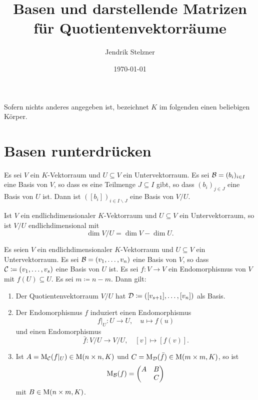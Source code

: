 \documentclass[a4paper,10pt]{article}
\title{Basen und darstellende Matrizen \\ für Quotientenvektorräume}
\author{Jendrik Stelzner}
\date{\today}
\begin{document}
\maketitle





Sofern nichts anderes angegeben ist, bezeichnet $K$ im folgenden einen beliebigen Körper.





\section{Basen runterdrücken}

\begin{lemma}
  Es sei $V$ ein $K$-Vektorraum und $U \subseteq V$ ein Untervektorraum.
  Es sei $\mathcal{B} = (b_i)_{i \in I}$ eine Basis von $V$, so dass es eine Teilmenge $J \subseteq I$ gibt, so dass $(b_i)_{j \in J}$ eine Basis von $U$ ist.
  Dann ist $([b_i])_{i \in I \smallsetminus J}$ eine Basis von $V/U$.
\end{lemma}

\begin{corollary}
  Ist $V$ ein endlichdimensionaler $K$-Vektorraum und $U \subseteq V$ ein Untervektorraum, so ist $V/U$ endlichdimensional mit
  \[
    \dim V/U = \dim V - \dim U.
  \]
\end{corollary}

\begin{proposition}
  Es seien $V$ ein endlichdimensionaler $K$-Vektorraum und $U \subseteq V$ ein Untervektorraum.
  Es sei $\mathcal{B} = (v_1, \dotsc, v_n)$ eine Basis von $V$, so dass $\mathcal{C} \coloneqq (v_1, \dotsc, v_s)$ eine Basis von $U$ ist.
  Es sei $f \colon V \to V$ ein Endomorphismus von $V$ mit $f(U) \subseteq U$.
  Es sei $m \coloneqq n-m$.
  Dann gilt:
  \begin{enumerate}
    \item
      Der Quotientenvektorraum $V/U$ hat $\mathcal{D} \coloneqq ([v_{s+1}], \dotsc, [v_n])$ als Basis.
    \item
      Der Endomorphismus $f$ induziert einen Endomorphismus
      \[
        f|_U \colon U \to U, \quad u \mapsto f(u)
      \]
      und einen Endomorphismus
      \[
        \bar{f} \colon V/U \to V/U, \quad [v] \mapsto [f(v)].
      \]
    \item
      Ist $A = \operatorname{M}_{\mathcal{C}}(f|_U) \in \operatorname{M}(n \times n, K)$ und $C = \operatorname{M}_{\mathcal{D}}(\bar{f}) \in \operatorname{M}(m \times m, K)$, so ist
      \[
        \operatorname{M}_{\mathcal{B}}(f)
        =
        \begin{pmatrix}
          A & B \\
            & C
        \end{pmatrix}
      \]
      mit $B \in \operatorname{M}(n \times m, K)$.
  \end{enumerate}
\end{proposition}
\end{document}

